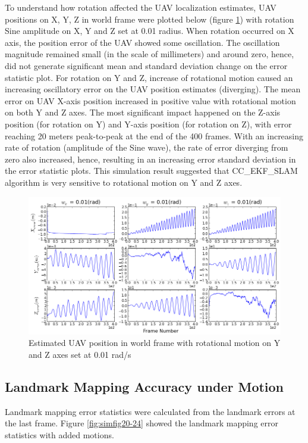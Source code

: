 To understand how rotation affected the UAV localization estimates,
UAV positions on X, Y, Z in world frame were plotted below (figure
\ref{fig:simfig14}) with rotation Sine amplitude on X, Y and Z set at
0.01 radius. When rotation occurred on X axis, the position error of
the UAV showed some oscillation. The oscillation magnitude remained
small (in the scale of millimeters) and around zero, hence, did not
generate significant mean and standard deviation change on the error
statistic plot. For rotation on Y and Z, increase of rotational motion
caused an increasing oscillatory error on the UAV position estimates
(diverging). The mean error on UAV X-axis position increased in
positive value with rotational motion on both Y and Z axes. The most
significant impact happened on the Z-axis position (for rotation on
Y) and Y-axis position (for rotation on Z), with error reaching 20
meters peak-to-peak at the end of the 400 frames. With an increasing
rate of rotation (amplitude of the Sine wave), the rate of error
diverging from zero also increased, hence, resulting in an increasing
error standard deviation in the error statistic plots. This simulation
result suggested that CC\_EKF\_SLAM algorithm is very sensitive to
rotational motion on Y and Z axes.

\begin{figure}[h]
  \centering
  \includegraphics[width=13cm, keepaspectratio=true]{./Figures/SimulationFigures/Figure14.png}
  \caption{Estimated UAV position in world frame with rotational
    motion on Y and Z axes set at 0.01 rad/s}
  \label{fig:simfig14}
\end{figure}
\FloatBarrier

\subsection{Landmark Mapping Accuracy under Motion}\label{sec:landmarkMotion}
Landmark mapping error statistics were calculated from the landmark
errors at the last frame. Figure \ref{fig:simfig20-24} showed the
landmark mapping error statistics with added motions. 

